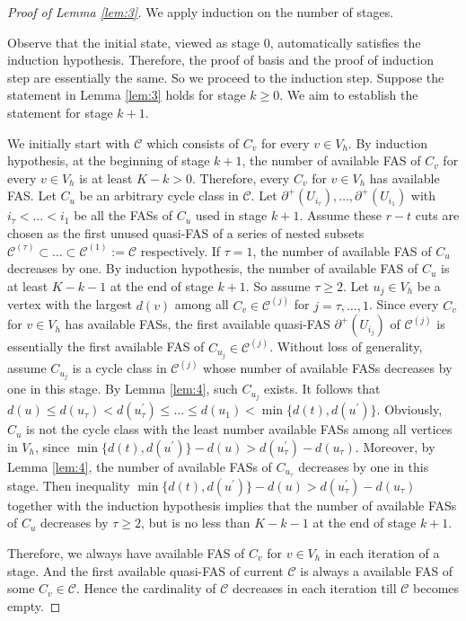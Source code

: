 \documentclass[11pt]{article}
\begin{document}
\begin{proof}[Proof of Lemma \ref{lem:3}]
We apply induction on the number of stages.

Observe that the initial state, viewed as stage 0, automatically satisfies the induction hypothesis. Therefore, the proof of basis and the proof of induction step are essentially the same. So we proceed to the induction step. Suppose the statement in Lemma \ref{lem:3} holds for stage $k\geq 0$. We aim to establish the statement for stage $k+1$.

We initially start with $\mathcal{C}$ which consists of $C_v$ for every $v\in V_h$. By induction hypothesis, at the beginning of stage $k+1$, the number of available FAS of $C_v$ for every $v\in V_h$ is at least $K-k>0$. Therefore, every $C_v$ for $v\in V_h$ has available FAS. Let $C_u$ be an arbitrary cycle class in $\mathcal{C}$. Let $\partial^+(U_{i_\tau}),\dots,\partial^+(U_{i_1})$ with $i_\tau<\dots<i_1$ be all the FASs of $C_u$ used in stage $k+1$. Assume these $r-t$ cuts are chosen as the first unused quasi-FAS of a series of nested subsets $\mathcal{C}^{(\tau)}\subset\dots\subset\mathcal{C}^{(1)}:=\mathcal{C}$ respectively. If $\tau=1$, the number of available FAS of $C_u$ decreases by one. By induction hypothesis, the number of available FAS of $C_u$ is at least $K-k-1$ at the end of stage $k+1$. So assume $\tau\geq 2$. Let $u_j\in V_h$ be a vertex with the largest $d(v)$ among all $C_v\in \mathcal{C}^{(j)}$ for $j=\tau,\dots,1$. Since every $C_v$ for $v\in V_h$ has available FASs, the first available quasi-FAS $\partial^+(U_{i_j})$ of $\mathcal{C}^{(j)}$ is essentially the first available FAS of $C_{u_j}\in \mathcal{C}^{(j)}$. Without loss of generality, assume $C_{u_j}$ is a cycle class in $\mathcal{C}^{(j)}$ whose number of available FASs decreases by one in this stage. By Lemma \ref{lem:4}, such $C_{u_j}$ exists. It follows that $d(u)\leq d(u_\tau)< d(u^\prime_\tau)\leq\dots\leq d(u_1)< \min\{d(t),d(u^\prime)\}$. Obviously, $C_u$ is not the cycle class with the least number available FASs among all vertices in $V_h$, since $\min\{d(t),d(u^\prime)\}-d(u)> d(u_\tau^\prime)-d(u_\tau)$. Moreover, by Lemma \ref{lem:4}, the number of available FASs of $C_{u_\tau}$ decreases by one in this stage. Then inequality $\min\{d(t),d(u^\prime)\}-d(u)>d(u_\tau^\prime)-d(u_\tau)$ together with the induction hypothesis implies that the number of available FASs of $C_u$ decreases by $\tau\geq 2$, but is no less than $K-k-1$ at the end of stage $k+1$.

Therefore, we always have available FAS of $C_v$ for $v\in V_h$ in each iteration of a stage. And the first available quasi-FAS of current $\mathcal{C}$ is always a available FAS of some $C_v\in \mathcal{C}$. Hence the cardinality of $\mathcal{C}$ decreases in each iteration till $\mathcal{C}$ becomes empty.
\end{proof}
\end{document}
